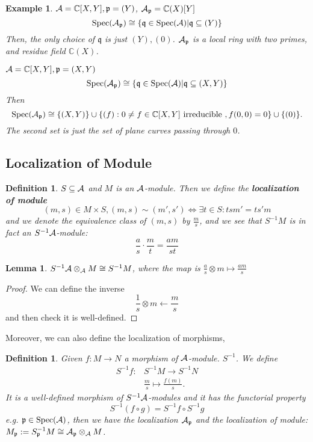 \documentclass[11pt]{article}
\newtheorem{lemma}[thm]{Lemma}
\newtheorem{dfn}[thm]{Definition}
\newtheorem{ex}[thm]{Example}
\newcommand{\cplx}{\mathbb C}
\newcommand{\scp}{{\mathfrak p}}
\newcommand{\scq}{\mathfrak q}
\newcommand{\cala}{{\cal A}}
\newcommand{\lrta}{\longrightarrow}
\newcommand{\Llrta}{\Longleftrightarrow}
\begin{document}
\begin{ex}
$\cala=\cplx[X,Y],\scp=(Y)$, $\cala_\scp=\cplx(X)[Y]$\\
$$
\text{Spec}(\cala_\scp)\cong \left\{\scq\in \text{Spec}(\cala)|\scq\subseteq (Y)\right\}
$$
Then, the only choice of $\scq$ is just $(Y),(0)$. 
$\cala_\scp$ is a local ring with two primes, and residue field $\cplx(X)$.

$\cala=\cplx[X,Y],\scp=(X,Y)$\\
$$
\text{Spec}(\cala_\scp)\cong \left\{\scq\in \text{Spec}(\cala)|\scq\subseteq (X,Y)\right\}
$$
Then
$$
\text{Spec}(\cala_\scp)\cong \{(X,Y)\}\cup\{(f):0\neq f\in \cplx[X,Y] \text{ irreducible }, f(0,0)=0\}\cup\{(0)\}.
$$
The second set is just the set of plane curves passing through $0$.
\end{ex}

\subsection*{Localization of Module}
\begin{dfn}
$S\subseteq \cala$ and $M$ is an $\cala$-module. Then we define the \textbf{localization of module}
$$
(m,s)\in M\times S, (m,s)\sim (m',s')\Llrta \exists t\in S: tsm'=ts'm
$$
and we denote the equivalence class of $(m,s)$ by $\frac{m}{s}$, and we see that $S^{-1}M$ is in fact an $S^{-1}\cala$-module:
$$
\frac{a}{s}\cdot \frac{m}{t}=\frac{am}{st}
$$
\end{dfn}

\begin{lemma}
$S^{-1}\cala\otimes_{\cala}M\cong S^{-1}M$, where the map is $\frac{a}{s}\otimes m\mapsto \frac{am}{s}$
\end{lemma}
\begin{proof}
We can define the inverse
$$
\frac{1}{s}\otimes m \longleftarrow\frac{m}{s}
$$
and then check it is well-defined.
\end{proof}

Moreover, we can also define the localization of morphisms,
\begin{dfn}
Given $f:M\lrta N$ a morphism of $\cala$-module. $S^{-1}$. We define 
$$
\begin{aligned}
S^{-1}f:&S^{-1}M\lrta S^{-1}N\\
& \frac{m}{s}\longmapsto\frac{f(m)}{s}.
\end{aligned}
$$
It is a well-defined morphism of $S^{-1}\cala$-modules and it has the functorial property
$$
S^{-1}(f\circ g)=S^{-1}f\circ S^{-1}g
$$
e.g. 
$\scp\in \text{Spec}(\cala)$, then we have the localization $\cala_\scp$ and the localization of module: $M_\scp:=S^{-1}_\scp M\cong \cala_{\scp}\otimes_\cala M$.
\end{dfn}
\end{document}
